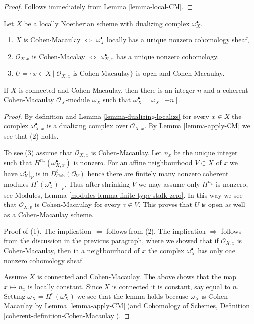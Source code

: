 \begin{proof}
Follows immediately from Lemma \ref{lemma-local-CM}.
\end{proof}

\begin{lemma}
\label{lemma-dualizing-module-CM-scheme}
Let $X$ be a locally Noetherian scheme with dualizing complex
$\omega_X^\bullet$.
\begin{enumerate}
\item $X$ is Cohen-Macaulay $\Leftrightarrow$ $\omega_X^\bullet$
locally has a unique nonzero cohomology sheaf,
\item $\mathcal{O}_{X, x}$ is Cohen-Macalay $\Leftrightarrow$
$\omega_{X, x}^\bullet$ has a unique nonzero cohomology,
\item $U = \{x \in X \mid \mathcal{O}_{X, x}\text{ is Cohen-Macaulay}\}$
is open and Cohen-Macaulay.
\end{enumerate}
If $X$ is connected and Cohen-Macaulay, then there is an integer $n$
and a coherent Cohen-Macaulay $\mathcal{O}_X$-module $\omega_X$
such that $\omega_X^\bullet = \omega_X[-n]$.
\end{lemma}

\begin{proof}
By definition and Lemma \ref{lemma-dualizing-localize} for every $x \in X$
the complex $\omega_{X, x}^\bullet$ is a dualizing complex over
$\mathcal{O}_{X, x}$. By Lemma \ref{lemma-apply-CM} we see that (2) holds.

\medskip\noindent
To see (3) assume that $\mathcal{O}_{X, x}$ is Cohen-Macaulay.
Let $n_x$ be the unique integer such that
$H^{n_{x}}(\omega_{X, x}^\bullet)$ is nonzero.
For an affine neighbourhood $V \subset X$
of $x$ we have $\omega_X^\bullet|_V$ is in $D^b_{\textit{Coh}}(\mathcal{O}_V)$
hence there are finitely many nonzero coherent modules
$H^i(\omega_X^\bullet)|_V$. Thus after shrinking $V$ we may assume
only $H^{n_x}$ is nonzero, see
Modules, Lemma \ref{modules-lemma-finite-type-stalk-zero}.
In this way we see that $\mathcal{O}_{X, v}$ is Cohen-Macaulay
for every $v \in V$. This proves that $U$ is open as well
as a Cohen-Macaulay scheme.

\medskip\noindent
Proof of (1). The implication $\Leftarrow$ follows from (2).
The implication $\Rightarrow$ follows from the discussion
in the previous paragraph, where we showed that if $\mathcal{O}_{X, x}$
is Cohen-Macaulay, then in a neighbourhood of $x$ the complex
$\omega_X^\bullet$ has only one nonzero cohomology sheaf.

\medskip\noindent
Assume $X$ is connected and Cohen-Macaulay. The above shows that
the map $x \mapsto n_x$ is locally constant.
Since $X$ is connected it is constant, say equal to $n$.
Setting $\omega_X = H^n(\omega_X^\bullet)$ we see that the lemma
holds because $\omega_X$ is Cohen-Macaulay by
Lemma \ref{lemma-apply-CM}
(and Cohomology of Schemes, Definition
\ref{coherent-definition-Cohen-Macaulay}).
\end{proof}

